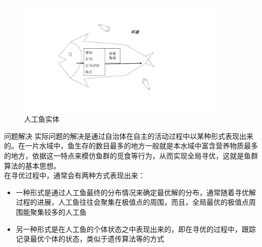 \documentclass[UTF8]{ctexart}
\begin{document}
\begin{section}
\begin{subsection}
\begin{subsubsection}
\begin{figure}[htbp]
	\centering
	\includegraphics[width=0.9\textwidth]{../../pic/fish2.pdf}
	\caption{人工鱼实体}
\end{figure}
\end{subsubsection}
\begin{subsubsection}
	{问题解决}	实际问题的解决是通过自治体在自主的活动过程中以某种形式表现出来的。在一片水域中，鱼生存的数目最多的地方一般就是本水域中富含营养物质最多的地方，依据这一特点来模仿鱼群的觅食等行为，从而实现全局寻优，这就是鱼群算法的基本思想。\\在寻优过程中，通常会有两种方式表现出来：
\begin{itemize}
	\item{一种形式是通过人工鱼最终的分布情况来确定最优解的分布，通常随着寻优解过程的进展，人工鱼往往会聚集在极值点的周围，而且，全局最优的极值点周围能聚集较多的人工鱼}
	\item{另一种形式是在人工鱼的个体状态之中表现出来的，即在寻优的过程中，跟踪记录最优个体的状态，类似于遗传算法等的方式}
\end{itemize}
\end{subsubsection}
\end{subsection}


\end{section}
\end{document}
